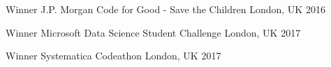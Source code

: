 



\begin{cvhonors}

  \cvhonor
    {Winner}
    {J.P. Morgan Code for Good - Save the Children}
    {London, UK}
    {2016}

  \cvhonor
    {Winner}
    {Microsoft Data Science Student Challenge}
    {London, UK}
    {2017}

  \cvhonor
    {Winner}
    {Systematica Codeathon}
    {London, UK}
    {2017}

\end{cvhonors}
